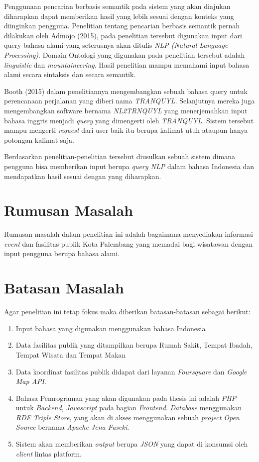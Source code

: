 Penggunaan pencarian berbasis semantik pada sistem yang akan diajukan diharapkan dapat memberikan hasil yang lebih sesuai dengan konteks yang diinginkan pengguna. Penelitian tentang pencarian berbasis semantik pernah dilakukan oleh Admojo (2015), pada penelitian tersebut digunakan input dari query bahasa alami yang seterusnya akan ditulis \emph{NLP (Natural Language Processing)}. Domain Ontologi yang digunakan pada penelitian tersebut adalah \emph{linguistic} dan \emph{mountaineering}. Hasil penelitian mampu memahami input bahasa alami secara sintaksis dan secara semantik.\

Booth (2015) dalam penelitiannya mengembangkan sebuah bahasa query untuk perencanaan perjalanan yang diberi nama \emph{TRANQUYL}. Selanjutnya mereka juga mengembangkan software bernama \emph{NL2TRNQUYL} yang menerjemahkan input bahasa inggris menjadi \emph{query} yang dimengerti oleh \emph{TRANQUYL}. Sistem tersebut mampu mengerti \emph{request} dari user baik itu berupa kalimat utuh ataupun hanya potongan kalimat saja.\

Berdasarkan penelitian-penelitian tersebut diusulkan sebuah sistem dimana pengguna bisa memberikan input berupa \emph{query NLP} dalam bahasa Indonesia dan mendapatkan hasil sesuai dengan yang diharapkan.


\section{Rumusan Masalah}
Rumusan masalah dalam penelitian ini adalah bagaimana menyediakan informasi \emph{event} dan fasilitas publik Kota Palembang yang memadai bagi wisatawan  dengan input pengguna berupa bahasa alami.\


\section{Batasan Masalah}
Agar penelitian ini tetap fokus maka diberikan batasan-batasan sebagai berikut:
\begin{enumerate}
  \item Input bahasa yang digunakan menggunakan bahasa Indonesia
  \item Data fasilitas publik yang ditampilkan berupa Rumah Sakit, Tempat Ibadah, Tempat Wisata dan Tempat Makan
  \item Data koordinat fasilitas publik didapat dari layanan \emph{Foursquare} dan \emph{Google Map API}.
  \item Bahasa Pemrograman yang akan digunakan pada thesis ini adalah \emph{PHP} untuk \emph{Backend}, \emph{Javascript} pada bagian \emph{Frontend}. \emph{Database} menggunakan \emph{RDF Triple Store}, yang akan di akses menggunakan sebuah \emph{project Open Source} bernama \emph{Apache Jena Fuseki}.
  \item Sistem akan memberikan \emph{output} berupa \emph{JSON} yang dapat di konsumsi oleh \emph{client} lintas platform. 
\end{enumerate}


